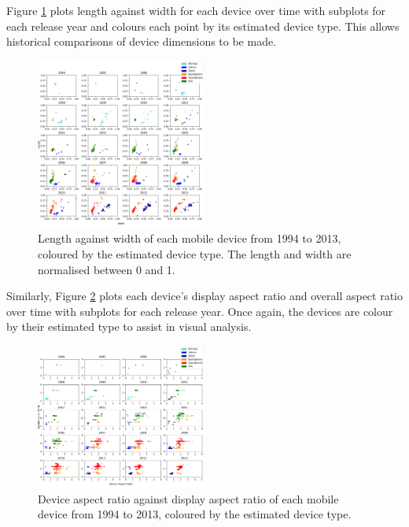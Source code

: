 \documentclass[conference]{IEEEtran}
\begin{document}
Figure \ref{fig:DimensionsYear} plots length against width for each device over
time with subplots for each release year and colours each point by its estimated
device type. This allows historical comparisons of device dimensions to be made.

\begin{figure}
    \centering
    \includegraphics[width=0.5\textwidth]{../Visualisations/B/length-width-ctype-syear.png}
    \caption{Length against width of each mobile device from 1994 to 2013,
	coloured by the estimated device type. The length and width are
	normalised between 0 and 1.}
    \label{fig:DimensionsYear}
\end{figure}

Similarly, Figure \ref{fig:AspectRatioYear} plots each device's display
aspect ratio and overall aspect ratio over time with subplots for each release
year.
Once again, the devices are colour by their estimated type to assist in visual analysis.

\begin{figure}
    \centering
    \includegraphics[width=0.5\textwidth]{../Visualisations/B/dr-r-ctype-syear.png}
    \caption{Device aspect ratio against display aspect ratio of each mobile
	device from 1994 to 2013, coloured by the estimated device type.}
    \label{fig:AspectRatioYear}
\end{figure}
\end{document}
